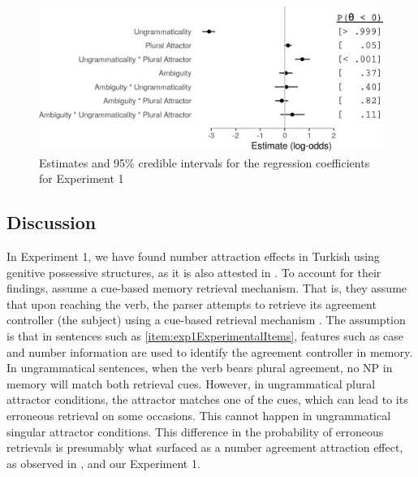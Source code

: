 \documentclass[doc,a4paper,man,natbib,floatsintext,noextraspace]{apa6}\usepackage[]{graphicx}\usepackage[]{color}
\begin{document}
\begin{figure}[h]
\centering
\includegraphics[width=\textwidth]{figures/exp1ResponseModelPlot-1.png}
\caption{Estimates and 95\% credible intervals for the regression coefficients for Experiment 1}
\label{fig:exp1ResponseModel}
\end{figure}



\subsection{Discussion} \label{sec:exp1:discussion}

In Experiment 1, we have found number attraction effects in Turkish using genitive possessive structures, as it is also attested in \citet{LagoEtAl:2018}. To account for their findings, \citet{LagoEtAl:2018} assume a cue-based memory retrieval mechanism. That is, they assume that upon reaching the verb, the parser attempts to retrieve its agreement controller (the subject) using a cue-based retrieval mechanism \citep{LewisVasishth:2005,JagerEngelmannVasishth:2017}. The assumption is that in sentences such as \ref{item:exp1ExperimentalItems}, features such as case and number information are used to identify the agreement controller in memory. In ungrammatical sentences, when the verb bears plural agreement, no NP in memory will match both retrieval cues. However, in ungrammatical plural attractor conditions, the attractor matches one of the cues, which can lead to its erroneous retrieval on some occasions. This cannot happen in ungrammatical singular attractor conditions. This difference in the probability of erroneous retrievals is presumably what surfaced as a number agreement attraction effect, as observed in \citet{LagoEtAl:2018}, and our Experiment 1.
\end{document}

